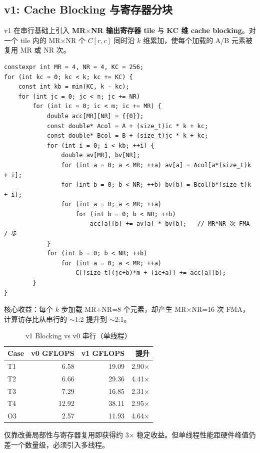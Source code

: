 \documentclass[11pt,a4paper,fontset=fandol]{ctexart}
\begin{document}
\subsection{v1: Cache Blocking 与寄存器分块}
v1 在串行基础上引入 \textbf{MR$\times$NR 输出寄存器 tile} 与 \textbf{KC 维 cache blocking}。对一个 tile 内的 MR$\times$NR 个 $C[r,c]$ 同时沿 $k$ 维累加，使每个加载的 A/B 元素被复用 MR 或 NR 次。
\begin{lstlisting}
constexpr int MR = 4, NR = 4, KC = 256;
for (int kc = 0; kc < k; kc += KC) {
    const int kb = min(KC, k - kc);
    for (int jc = 0; jc < n; jc += NR)
        for (int ic = 0; ic < m; ic += MR) {
            double acc[MR][NR] = {{0}};
            const double* Acol = A + (size_t)ic * k + kc;
            const double* Bcol = B + (size_t)jc * k + kc;
            for (int i = 0; i < kb; ++i) {
                double av[MR], bv[NR];
                for (int a = 0; a < MR; ++a) av[a] = Acol[a*(size_t)k + i];
                for (int b = 0; b < NR; ++b) bv[b] = Bcol[b*(size_t)k + i];
                for (int a = 0; a < MR; ++a)
                    for (int b = 0; b < NR; ++b)
                        acc[a][b] += av[a] * bv[b];   // MR*NR 次 FMA / 步
            }
            for (int b = 0; b < NR; ++b)
                for (int a = 0; a < MR; ++a)
                    C[(size_t)(jc+b)*m + (ic+a)] += acc[a][b];
        }
}
\end{lstlisting}
核心收益：每个 $k$ 步加载 MR+NR=8 个元素，却产生 MR$\times$NR=16 次 FMA，计算访存比从串行的 $\sim$1:2 提升到 $\sim$2:1。

\begin{table}[H]
\centering
\caption{v1 Blocking vs v0 串行（单线程）}
\small
\begin{tabular}{lrrr}
\toprule
Case & v0 GFLOPS & v1 GFLOPS & 提升 \\
\midrule
T1 & 6.58 & 19.09 & 2.90$\times$ \\
T2 & 6.66 & 29.36 & 4.41$\times$ \\
T3 & 7.29 & 16.85 & 2.31$\times$ \\
T4 & 12.92 & 38.11 & 2.95$\times$ \\
O3 & 2.57 & 11.93 & 4.64$\times$ \\
\bottomrule
\end{tabular}
\end{table}
仅靠改善局部性与寄存器复用即获得约 3$\times$ 稳定收益。但单线程性能距硬件峰值仍差一个数量级，必须引入多线程。
\end{document}
